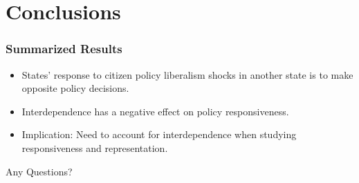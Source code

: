 \documentclass{beamer}
\begin{document}
\section{Conclusions}

\begin{frame}
	\frametitle{Summarized Results}
	\begin{itemize}
		\item States' response to citizen policy liberalism shocks in another state is to make opposite policy decisions.
		\item Interdependence has a negative effect on policy responsiveness.
		\item Implication: Need to account for interdependence when studying responsiveness and representation.
	\end{itemize}
\end{frame}

\begin{frame}
	\begin{center}
		\begin{LARGE}
			Any Questions?
		\end{LARGE}
	\end{center}
\end{frame}
\end{document}
